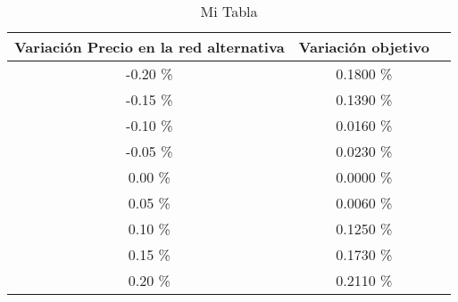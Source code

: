 \begin{table}
\centering
\begin{tabular}{|c|c|c|}
\hline
 Variación Precio en la red alternativa & Variación objetivo \\ \hline
-0.20 \% & 0.1800 \% \\ \hline
-0.15 \% & 0.1390 \% \\ \hline
-0.10 \% & 0.0160 \% \\ \hline
-0.05 \% & 0.0230 \% \\ \hline
0.00 \% & 0.0000 \% \\ \hline
0.05 \% & 0.0060 \% \\ \hline
0.10 \% & 0.1250 \% \\ \hline
0.15 \% & 0.1730 \% \\ \hline
0.20 \% & 0.2110 \% \\ \hline
\end{tabular}
\caption{Mi Tabla}
\end{table}
